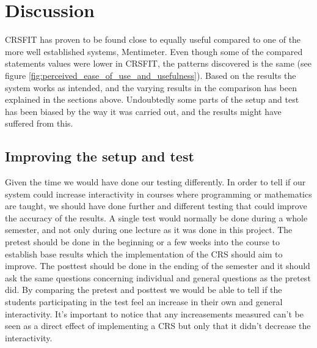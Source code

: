 \section{Discussion}





CRSFIT has proven to be found close to equally useful compared to one of the more well established systems, Mentimeter. Even though some of the compared statements values were lower in CRSFIT, the patterns discovered is the same (see figure \ref{fig:perceived_ease_of_use_and_usefulness}). Based on the results the system works as intended, and the varying results in the comparison has been explained in the sections above. Undoubtedly some parts of the setup and test has been biased by the way it was carried out, and the results might have suffered from this.


\subsection{Improving the setup and test}
Given the time we would have done our testing differently. In order to tell if our system could increase interactivity in courses where programming or mathematics are taught, we should have done further and different testing that could improve the accuracy of the results. A single test would normally be done during a whole semester, and not only during one lecture as it was done in this project. The pretest should be done in the beginning or a few weeks into the course to establish base results which the implementation of the CRS should aim to improve. The posttest should be done in the ending of the semester and it should ask the same questions concerning individual and general questions as the pretest did. By comparing the pretest and posttest we would be able to tell if the students participating in the test feel an increase in their own and general interactivity. It's important to notice that any increasements measured can't be seen as a direct effect of implementing a CRS but only that it didn't decrease the interactivity. 


